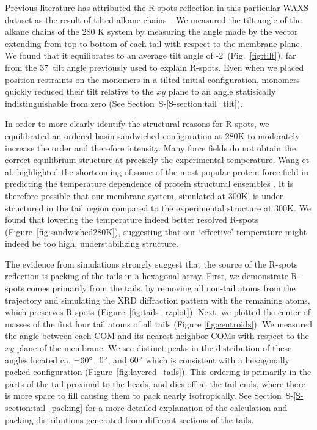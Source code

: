 \documentclass[journal=jpcbfk,manuscript=article]{achemso}
\begin{document}
  Previous literature has attributed the R-spots reflection in this particular
  WAXS dataset as the result of tilted alkane chains~\cite{feng_scalable_2014}.
  We measured the tilt angle of the alkane chains of the 280 K system by measuring
  the angle made by the vector extending from top to bottom of each tail with
  respect to the membrane plane. We found that it equilibrates to an average tilt
  angle of -2\degree~(Fig.~\ref{fig:tilt}), far from the 37\degree~tilt angle
  previously used to explain R-spots. Even when we placed position restraints on
  the monomers in a tilted initial configuration, monomers quickly reduced their
  tilt relative to the $xy$ plane to an angle statisically indistinguishable from
  zero (See Section~S-\ref{S-section:tail_tilt}). 

  In order to more clearly identify the structural reasons for R-spots, we
  equilibrated an ordered basin sandwiched configuration at 280K to moderately
  increase the order and therefore intensity.  Many force fields do not obtain
  the correct equilibrium structure at precisely the experimental temperature.
  Wang et al. highlighted the shortcoming of some of the most popular protein
  force field in predicting the temperature dependence of protein structural
  ensembles \cite{wang_building_2017}. It is therefore possible that   %
  our membrane system, simulated at 300K, is under-structured in the tail region
  compared to the experimental structure at 300K. We found that lowering the
  temperature indeed better resolved R-spots (Figure~\ref{fig:sandwiched280K}),
  suggesting that our `effective' temperature might indeed be too high,
  understabilizing structure. 

  The evidence from simulations strongly suggest that the source of
  the R-spots reflection is packing of the tails in a hexagonal array.
  First, we demonstrate R-spots comes primarily from the tails, by
  removing all non-tail atoms from the trajectory and simulating the
  XRD diffraction pattern with the remaining atoms, which preserves
  R-spots (Figure~\ref{fig:tails_rzplot}).  Next, we plotted the center
  of masses of the first four tail atoms of all tails (Figure
  \ref{fig:centroids}). We measured the angle between each COM
  and its nearest neighbor COMs with respect to the
  $xy$ plane of the membrane. We see distinct peaks in the
  distribution of these angles located ca. $-60\degree$, $0\degree$,
  and $60\degree$ which is consistent with a hexagonally packed
  configuration (Figure~\ref{fig:layered_tails}).  This ordering is
  primarily in the parts of the tail proximal to the heads, and dies
  off at the tail ends, where there is more space to fill causing them
  to pack nearly isotropically. See Section~S-\ref{S-section:tail_packing} for
  a more detailed explanation of the calculation and packing
  distributions generated from different sections of the tails.
\end{document}
